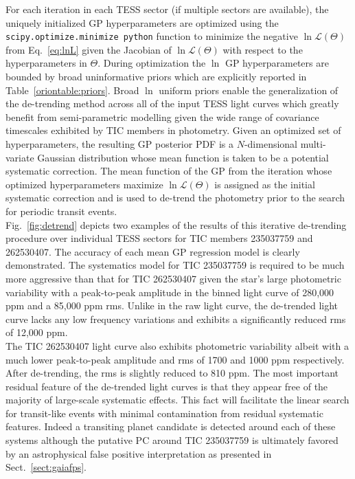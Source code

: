 For each iteration in each TESS sector (if multiple sectors are available),
the uniquely initialized GP hyperparameters are optimized
using the \texttt{scipy.optimize.minimize python} function to minimize the negative
$\ln{\mathcal{L}(\Theta)}$ from Eq.~\ref{eq:lnL}
given the Jacobian of $\ln{\mathcal{L}(\Theta)}$ with respect to the hyperparameters in
$\Theta$. During optimization the $\ln$ GP hyperparameters are bounded by broad uninformative priors
which are explicitly reported in Table~\ref{oriontable:priors}. Broad $\ln$ uniform priors enable
the generalization of the \pipeline{} de-trending method across all of the input TESS light curves
which greatly benefit from semi-parametric modelling given the wide range of covariance timescales
exhibited by TIC members in photometry.
Given an optimized set of hyperparameters, the resulting GP posterior PDF is a $N$-dimensional
multi-variate Gaussian distribution whose mean function is taken to be a potential systematic correction.
The mean function of the GP from the iteration whose optimized hyperparameters maximize
$\ln{\mathcal{L}(\Theta)}$ is assigned as the initial systematic
correction and is used to de-trend the photometry prior to the search for periodic transit events. \\



Fig.~\ref{fig:detrend} depicts two examples of the results of this iterative de-trending procedure over
individual TESS sectors for TIC members 235037759 and 262530407. The accuracy of each mean GP regression model
is clearly demonstrated. The systematics model for TIC 235037759
is required to be much more aggressive than that for TIC 262530407
given the star's large photometric variability with a peak-to-peak
amplitude in the binned light curve of 280,000 ppm and a 85,000 ppm rms. Unlike in the raw
light curve, the de-trended light curve lacks any low frequency variations and exhibits a significantly
reduced rms of 12,000 ppm. \\

The TIC 262530407 light curve also exhibits photometric variability albeit with a much lower peak-to-peak
amplitude and rms of 1700 and 1000 ppm respectively. After de-trending, the rms is slightly reduced to 
810 ppm. The most important residual feature of the de-trended light curves is that they appear free
of the majority of large-scale systematic effects. This fact will facilitate the linear search for
transit-like events with minimal contamination from residual systematic features. Indeed 
a transiting planet candidate is detected
around each of these systems although the putative PC around TIC 235037759
is ultimately favored by an astrophysical false positive interpretation as presented in
Sect.~\ref{sect:gaiafps}. \\

